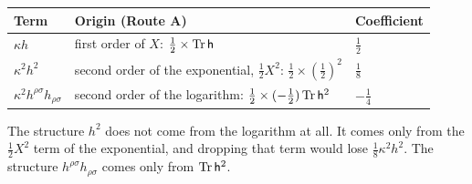 \begin{center}
\small
\begin{tabular}{lll}
\toprule
Term & Origin (Route A) & Coefficient\\
\midrule
$\kappa h$ & first order of $X$: $\tfrac12\times\operatorname{Tr}\mathsf{h}$ & $\tfrac12$\\
$\kappa^2h^2$ & second order of the exponential, $\tfrac12X^2$: $\tfrac12\times(\tfrac12)^2$ & $\tfrac18$\\
$\kappa^2h^{\rho\sigma}h_{\rho\sigma}$ & second order of the logarithm: $\tfrac12\times(-\tfrac12)\operatorname{Tr}\mathsf{h}^2$ & $-\tfrac14$\\
\bottomrule
\end{tabular}
\end{center}
The structure $h^2$ does not come from the logarithm at all. It comes only from
the $\tfrac12X^2$ term of the exponential, and dropping that term would lose
$\tfrac18\kappa^2h^2$. The structure $h^{\rho\sigma}h_{\rho\sigma}$ comes only
from $\operatorname{Tr}\mathsf{h}^2$.

